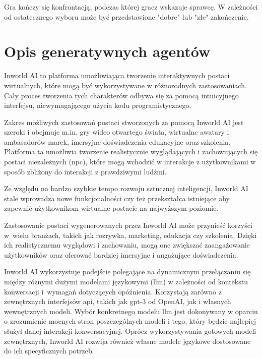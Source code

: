 Gra kończy się konfrontacją, podczas której gracz wskazuje sprawcę.
W zależności od ostatecznego wyboru może być przedstawione "dobre" lub "złe" zakończenie.

\section{Opis generatywnych agentów}\label{section:ch6_2}

Inworld AI to platforma umożliwiająca tworzenie interaktywnych postaci wirtualnych, które mogą być
wykorzystywane w różnorodnych zastosowaniach. Cały proces tworzenia tych charakterów odbywa się za
pomocą intuicyjnego interfejsu, niewymagającego użycia kodu programistycznego.

Zakres możliwych zastosowań postaci stworzonych za pomocą Inworld AI jest szeroki i obejmuje m.in. gry
wideo otwartego świata, wirtualne awatary i ambasadorów marek, imersyjne doświadczenia edukacyjne oraz
szkolenia. Platforma ta umożliwia tworzenie realistycznie wyglądających i zachowujących się postaci
niezależnych (\gls{npc}), które mogą wchodzić w interakcje z użytkownikami w sposób zbliżony do interakcji z
prawdziwymi ludźmi.

Ze względu na bardzo szybkie tempo rozwoju sztucznej inteligencji, Inworld AI stale wprowadza nowe
funkcjonalności czy też przekształca istniejące aby zapewnić użytkownikom wirtualne postacie na
najwyższym poziomie.

Zastosowanie postaci wygenerowanych przez Inworld AI może przynieść korzyści w~wielu branżach, takich
jak rozrywka, marketing, edukacja czy szkolenia. Dzięki ich realistycznemu wyglądowi i zachowaniu, mogą
one zwiększać zaangażowanie użytkowników oraz oferować bardziej imersyjne i angażujące doświadczenia.

Inworld AI wykorzystuje podejście polegające na dynamicznym przełączaniu się między różnymi dużymi
modelami językowymi (\gls{llm}) w zależności od kontekstu konwersacji i~wymagań dotyczących opóźnienia\cite{inworld_docs}.
Korzystają zarówno z zewnętrznych interfejsów \gls{api}, takich jak \gls{gpt}-3 od OpenAI, jak i własnych
wewnętrznych modeli\cite{inworld_docs}. Wybór konkretnego modelu \gls{llm} jest dokonywany w oparciu o zrozumienie mocnych
stron poszczególnych modeli i tego, który będzie najlepiej służył danej interakcji konwersacyjnej.
Oprócz wykorzystywania gotowych modeli zewnętrznych, Inworld AI rozwija również własne modele
językowe dostosowane do ich specyficznych potrzeb\cite{inworld_docs}.

